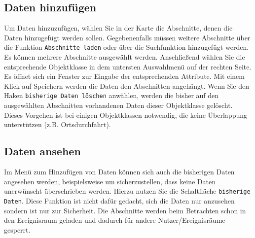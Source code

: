 \documentclass[a4paper,11pt,bibliography=totoc, listof=totoc,titlepage]{scrartcl}
\begin{document}
\subsection{Daten hinzufügen}
Um Daten hinzuzufügen, wählen Sie in der Karte die Abschnitte, denen die Daten hinzugefügt werden sollen. Gegebenenfalls müssen weitere Abschnitte über die Funktion \verb|Abschnitte laden| oder über die Suchfunktion hinzugefügt werden. Es können mehrere Abschnitte ausgewählt werden. Anschließend wählen Sie die entsprechende Objektklasse in dem untersten Auswahlmenü auf der rechten Seite. Es öffnet sich ein Fenster zur Eingabe der entsprechenden Attribute. Mit einem Klick auf Speichern werden die Daten den Abschnitten angehängt. Wenn Sie den Haken \verb|bisherige Daten löschen| anwählen, werden die bisher auf den ausgewählten Abschnitten vorhandenen Daten dieser Objektklasse gelöscht. Dieses Vorgehen ist bei einigen Objektklassen notwendig, die keine Überlappung unterstützen (z.B. Ortsdurchfahrt).

\subsection{Daten ansehen}
Im Menü zum Hinzufügen von Daten können sich auch die bisherigen Daten angesehen werden, beispielsweise um sicherzustellen, dass keine Daten unerwünscht überschrieben werden. Hierzu nutzen Sie die Schaltfläche \verb|bisherige Daten|. Diese Funktion ist nicht dafür gedacht, sich die Daten nur anzusehen sondern ist nur zur Sicherheit. Die Abschnitte werden beim Betrachten schon in den Ereignisraum geladen und dadurch für andere Nutzer/Ereignisräume gesperrt.

\clearpage

\printglossaries
\end{document}
